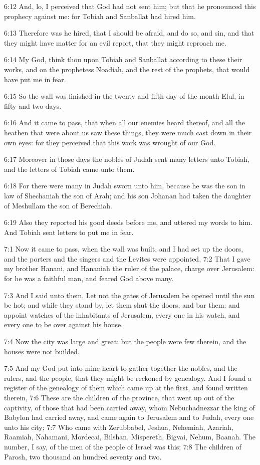 6:12 And, lo, I perceived that God had not sent him; but that he
pronounced this prophecy against me: for Tobiah and Sanballat had
hired him.

6:13 Therefore was he hired, that I should be afraid, and do so, and
sin, and that they might have matter for an evil report, that they
might reproach me.

6:14 My God, think thou upon Tobiah and Sanballat according to these
their works, and on the prophetess Noadiah, and the rest of the
prophets, that would have put me in fear.

6:15 So the wall was finished in the twenty and fifth day of the month
Elul, in fifty and two days.

6:16 And it came to pass, that when all our enemies heard thereof, and
all the heathen that were about us saw these things, they were much
cast down in their own eyes: for they perceived that this work was
wrought of our God.

6:17 Moreover in those days the nobles of Judah sent many letters unto
Tobiah, and the letters of Tobiah came unto them.

6:18 For there were many in Judah sworn unto him, because he was the
son in law of Shechaniah the son of Arah; and his son Johanan had
taken the daughter of Meshullam the son of Berechiah.

6:19 Also they reported his good deeds before me, and uttered my words
to him. And Tobiah sent letters to put me in fear.

7:1 Now it came to pass, when the wall was built, and I had set up the
doors, and the porters and the singers and the Levites were appointed,
7:2 That I gave my brother Hanani, and Hananiah the ruler of the
palace, charge over Jerusalem: for he was a faithful man, and feared
God above many.

7:3 And I said unto them, Let not the gates of Jerusalem be opened
until the sun be hot; and while they stand by, let them shut the
doors, and bar them: and appoint watches of the inhabitants of
Jerusalem, every one in his watch, and every one to be over against
his house.

7:4 Now the city was large and great: but the people were few therein,
and the houses were not builded.

7:5 And my God put into mine heart to gather together the nobles, and
the rulers, and the people, that they might be reckoned by genealogy.
And I found a register of the genealogy of them which came up at the
first, and found written therein, 7:6 These are the children of the
province, that went up out of the captivity, of those that had been
carried away, whom Nebuchadnezzar the king of Babylon had carried
away, and came again to Jerusalem and to Judah, every one unto his
city; 7:7 Who came with Zerubbabel, Jeshua, Nehemiah, Azariah,
Raamiah, Nahamani, Mordecai, Bilshan, Mispereth, Bigvai, Nehum,
Baanah. The number, I say, of the men of the people of Israel was
this; 7:8 The children of Parosh, two thousand an hundred seventy and
two.

